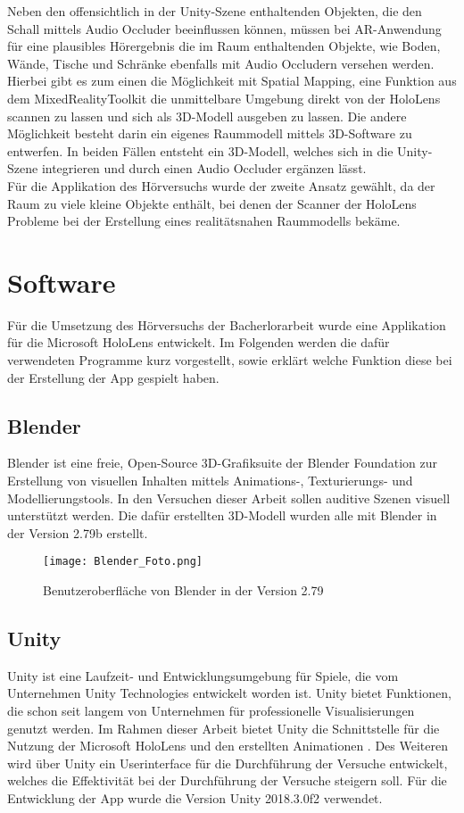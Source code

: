 Neben den offensichtlich in der Unity-Szene enthaltenden Objekten, die den Schall mittels Audio Occluder beeinflussen können, müssen bei AR-Anwendung für eine plausibles Hörergebnis die im Raum enthaltenden Objekte, wie Boden, Wände, Tische und Schränke ebenfalls mit Audio Occludern versehen werden. Hierbei gibt es zum einen die Möglichkeit mit \glqq Spatial Mapping\grqq, eine Funktion aus dem MixedRealityToolkit die unmittelbare Umgebung direkt von der HoloLens scannen zu lassen und sich als 3D-Modell ausgeben zu lassen.  Die andere Möglichkeit besteht darin ein eigenes Raummodell mittels 3D-Software zu entwerfen. In beiden Fällen entsteht ein 3D-Modell, welches sich in die Unity-Szene integrieren und durch einen Audio Occluder ergänzen lässt. \\
 
 Für die Applikation des Hörversuchs wurde der zweite Ansatz gewählt, da der Raum zu viele kleine Objekte enthält, bei denen der Scanner der HoloLens Probleme bei der Erstellung eines realitätsnahen Raummodells bekäme.  
 
 \section{Software}
Für die Umsetzung des Hörversuchs der Bacherlorarbeit wurde eine Applikation für die Microsoft HoloLens entwickelt.  Im Folgenden werden  die dafür verwendeten Programme kurz vorgestellt, sowie erklärt welche Funktion diese bei der Erstellung der App gespielt haben. 
 
 \subsection{Blender}
 Blender ist eine freie, Open-Source 3D-Grafiksuite der Blender Foundation zur Erstellung von visuellen Inhalten mittels Animations-, Texturierungs- und Modellierungstools. In den Versuchen dieser Arbeit sollen auditive Szenen visuell unterstützt werden. Die dafür erstellten 3D-Modell wurden alle mit Blender in der Version 2.79b erstellt. 
 
 \begin{figure}[H]
\centering
\texttt{[image: Blender\_Foto.png]}
\caption{Benutzeroberfläche von Blender in der Version 2.79}
\label{fig:Blender}
\end{figure} 

\newpage
 \subsection{Unity}
Unity ist eine  Laufzeit- und Entwicklungsumgebung für Spiele, die vom Unternehmen Unity Technologies entwickelt worden ist. Unity bietet Funktionen, die schon seit langem von Unternehmen für professionelle Visualisierungen genutzt werden. Im Rahmen dieser Arbeit bietet Unity die Schnittstelle für die Nutzung der Microsoft HoloLens und den erstellten Animationen . Des Weiteren wird über Unity ein Userinterface für die Durchführung der Versuche entwickelt, welches die Effektivität bei der Durchführung der Versuche steigern soll. Für die Entwicklung der App wurde die Version Unity 2018.3.0f2 verwendet. 

